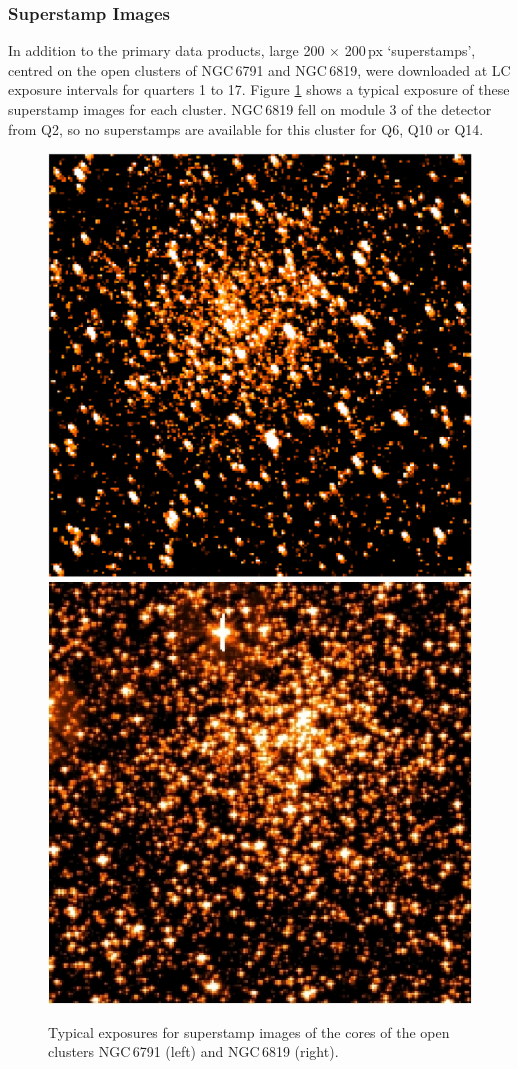 \subsubsection{Superstamp Images}
In addition to the primary data products, large 200 $\times$ 200\,px `superstamps', centred on the open clusters of NGC\,6791 and NGC\,6819, were downloaded at LC exposure intervals for quarters 1 to 17. Figure \ref{fig:SS} shows a typical exposure of these superstamp images for each cluster. NGC\,6819 fell on module 3 of the detector from Q2, so no superstamps are available for this cluster for Q6, Q10 or Q14.

\begin{figure}[htbp]
    \centering
    \includegraphics[width=0.45\linewidth]{Chapter1/ngc6791.jpg}
    \includegraphics[width=0.45\linewidth]{Chapter1/ngc6819.jpeg}
    \caption[Superstamps of NGC\,6791 and NGC\,6819]{Typical exposures for superstamp images of the cores of the open clusters NGC\,6791 (left) and NGC\,6819 (right).}
    \label{fig:SS}
\end{figure}



 




